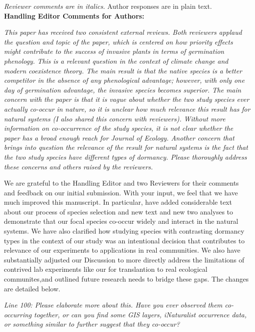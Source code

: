 \documentclass[11pt]{article}
\begin{document}
\emph{Reviewer comments are in italics.} Author responses are in plain text.\\

\textbf{Handling Editor Comments for Authors:}

\emph{This paper has received two consistent external reviews. Both reviewers applaud the question and topic of the paper, which is centered on how priority effects might contribute to the success of invasive plants in terms of germination phenology. This is a relevant question in the context of climate change and modern coexistence theory. The main result is that the native species is a better competitor in the absence of any phenological advantage; however, with only one day of germination advantage, the invasive species becomes superior. The main concern with the paper is that it is vague about whether the two study species ever actually co-occur in nature, so it is unclear how much relevance this result has for natural systems (I also shared this concern with reviewers). Without more information on co-occurrence of the study species, it is not clear whether the paper has a broad enough reach for Journal of Ecology. Another concern that brings into question the relevance of the result for natural systems is the fact that the two study species have different types of dormancy. Please thoroughly address these concerns and others raised by the reviewers. }

We are grateful to the Handling Editor and two Reviewers for their comments and feedback on our initial submission. With your input, we feel that we have much improved this manuscript. In particular, have added considerable text about our process of species selection and new text and new two analyses to demonstrate that our focal species co-occur widely and interact in the natural systems. We have also clarified how studying species with contrasting dormancy types in the context of our study was an intentional decision that contributes to relevance of our experiments to applications in real communities. We also have substantially adjusted our Discussion to more directly address the limitations of contrived lab experiments like our for translantion to real ecological communites,and outlined future research needs to bridge these gaps. The changes are detailed below.

\emph{Line 100: Please elaborate more about this. Have you ever observed them co-occurring together, or can you find some GIS layers, iNaturalist occurrence data, or something similar to further suggest that they co-occur?} 
\end{document}
